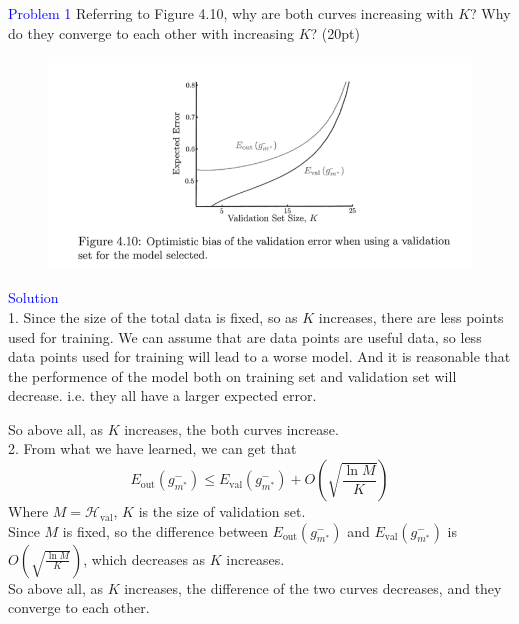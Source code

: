 \textcolor{blue}{Problem 1}
Referring to Figure 4.10, why are both curves increasing with $K$? Why do they converge to each other with increasing $K$? (20pt)
\begin{figure}[htbp]
    \centering
    \includegraphics[width=1.0\textwidth]{../fig/figure.png}
\end{figure}
\par


\textcolor{blue}{Solution}\\
1. Since the size of the total data is fixed, so as $K$ increases, there are less points used for training. We can assume that are data points are useful data, so less data points used for training will lead to a worse model. And it is reasonable that the performence of the model both on training set and validation set will decrease. i.e. they all have a larger expected error.

So above all, as $K$ increases, the both curves increase.\\

2. From what we have learned, we can get that
$$E_{\text{out}}(g^-_{m^*})\leq E_{\text{val}}(g^-_{m^*})+O\left(\sqrt{\frac{\ln M}{K}}\right)$$
Where $M=\mathcal{H}_{\text{val}}$, $K$ is the size of validation set.\\
Since $M$ is fixed, so the difference between $E_{\text{out}}(g^-_{m^*})$ and $E_{\text{val}}(g^-_{m^*})$ is $O\left(\sqrt{\frac{\ln M}{K}}\right)$, which decreases as $K$ increases.\\

So above all, as $K$ increases, the difference of the two curves decreases, and they converge to each other.

\newpage